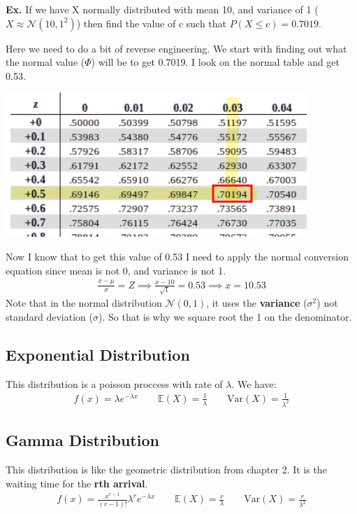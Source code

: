 \documentclass[12pt,letterpaper]{article} \usepackage{amsmath} \usepackage{graphicx} \usepackage[margin=1in]{geometry} \usepackage{longtable}  \usepackage{amssymb}
\begin{document}
	\begin{mdframed}
		\textbf{Ex. }If we have X normally distributed with mean 10, and variance of 1 ($X\approx \mathcal N(10,1^2)$) then find the value of c such that $P(X\le c) = 0.7019$.
		
		Here we need to do a bit of reverse engineering. We start with finding out what the normal value ($\Phi$) will be to get 0.7019. I look on the normal table and get 0.53.
		\begin{center}
			\includegraphics[width=0.5\linewidth]{normal-ex1}
		\end{center}
		Now I know that to get this value of 0.53 I need to apply the normal conversion equation since mean is not 0, and variance is not 1. 
		\begin{align*}
			\frac{x-\mu}{\sigma} = Z \implies \frac{x-10}{\sqrt{1}} = 0.53 \implies x = 10.53
		\end{align*}
		Note that in the normal distribution $\mathcal N(0,1)$, it uses the \textbf{variance} ($\sigma^2$) not standard deviation ($\sigma$). So that is why we square root the 1 on the denominator.
		
	\end{mdframed}
	
	\subsection{Exponential Distribution}
	This distribution is a poisson proccess with rate of $\lambda$. We have:
	\begin{align*}
		f(x) = \lambda e^{-\lambda x}  \qquad \mathbb E(X)=\frac{1}{\lambda} \qquad \text{Var}(X) = \frac{1}{\lambda^2}
	\end{align*}
	
	\subsection{Gamma Distribution}
	This distribution is like the geometric distribution from chapter 2. It is the waiting time for the \textbf{rth arrival}. 
	\begin{align*}
		f(x) = \frac{x^{r-1}}{(r-1)!}\lambda^re^{-\lambda x}  \qquad \mathbb E(X)=\frac{r}{\lambda} \qquad \text{Var}(X) = \frac{r}{\lambda^2}
	\end{align*}
	
\end{document}
